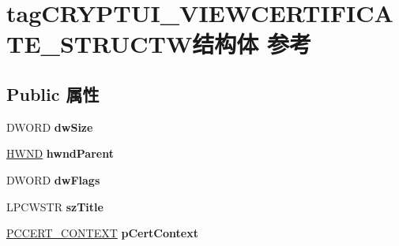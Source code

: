 \hypertarget{structtag_c_r_y_p_t_u_i___v_i_e_w_c_e_r_t_i_f_i_c_a_t_e___s_t_r_u_c_t_w}{}\section{tag\+C\+R\+Y\+P\+T\+U\+I\+\_\+\+V\+I\+E\+W\+C\+E\+R\+T\+I\+F\+I\+C\+A\+T\+E\+\_\+\+S\+T\+R\+U\+C\+T\+W结构体 参考}
\label{structtag_c_r_y_p_t_u_i___v_i_e_w_c_e_r_t_i_f_i_c_a_t_e___s_t_r_u_c_t_w}
\subsection*{Public 属性}
\begin{DoxyCompactItemize}
\item 
\mbox{\label{structtag_c_r_y_p_t_u_i___v_i_e_w_c_e_r_t_i_f_i_c_a_t_e___s_t_r_u_c_t_w_a59f304923640cbeb3ecbf67a0f239d33}} 
D\+W\+O\+RD {\bfseries dw\+Size}
\item 
\mbox{\label{structtag_c_r_y_p_t_u_i___v_i_e_w_c_e_r_t_i_f_i_c_a_t_e___s_t_r_u_c_t_w_aaa3ee24da53ed88d1f39556480bd9d74}} 
\hyperlink{interfacevoid}{H\+W\+ND} {\bfseries hwnd\+Parent}
\item 
\mbox{\label{structtag_c_r_y_p_t_u_i___v_i_e_w_c_e_r_t_i_f_i_c_a_t_e___s_t_r_u_c_t_w_a7da613d70e40006999b4d44bf2cfcbca}} 
D\+W\+O\+RD {\bfseries dw\+Flags}
\item 
\mbox{\label{structtag_c_r_y_p_t_u_i___v_i_e_w_c_e_r_t_i_f_i_c_a_t_e___s_t_r_u_c_t_w_aa4873be0fc02ae136cf9b75cd186fe6e}} 
L\+P\+C\+W\+S\+TR {\bfseries sz\+Title}
\item 
\mbox{\label{structtag_c_r_y_p_t_u_i___v_i_e_w_c_e_r_t_i_f_i_c_a_t_e___s_t_r_u_c_t_w_afdcd7dabd10b4fb933bf5b07878eead1}} 
\hyperlink{struct___c_e_r_t___c_o_n_t_e_x_t}{P\+C\+C\+E\+R\+T\+\_\+\+C\+O\+N\+T\+E\+XT} {\bfseries p\+Cert\+Context}

\end{DoxyCompactItemize}
